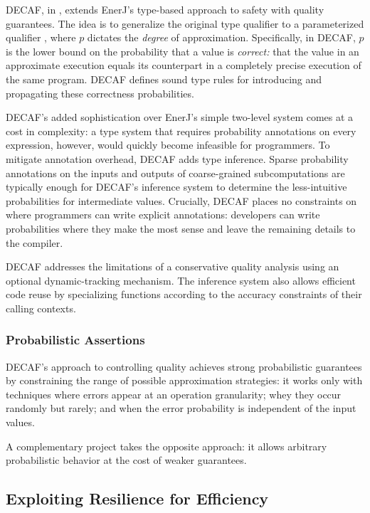 DECAF, in , extends EnerJ's type-based approach to safety with
quality guarantees.
The idea is to generalize the original  type qualifier to a
parameterized qualifier , where $p$ dictates the
\emph{degree} of approximation.
Specifically, in DECAF, $p$ is the lower bound on the probability that a value
is \emph{correct:} that the value in an approximate execution equals its
counterpart in a completely precise execution of the same program.
DECAF defines sound type rules for introducing and propagating these
correctness probabilities.

DECAF's added sophistication over EnerJ's simple two-level system comes at a
cost in complexity:
a type system that requires probability annotations on every expression,
however, would quickly become infeasible for programmers.
To mitigate annotation overhead, DECAF adds type inference.
Sparse probability annotations on the inputs and outputs of coarse-grained
subcomputations are typically enough for DECAF's inference system to determine
the less-intuitive probabilities for intermediate values.
Crucially, DECAF places no constraints on where programmers can write explicit
annotations:
developers can write probabilities where they make the most sense and leave
the remaining details to the compiler.

DECAF addresses the limitations of a conservative quality analysis using
an optional dynamic-tracking mechanism.
The inference system also allows efficient code reuse by specializing
functions according to the accuracy constraints of their calling contexts.

\subsubsection{Probabilistic Assertions}

DECAF's approach to controlling quality achieves strong probabilistic
guarantees by constraining the range of possible approximation strategies:
it works only with techniques where errors appear at an operation granularity;
whey they occur randomly but rarely; and when the error probability is
independent of the input values.

A complementary project takes the opposite approach:
it allows arbitrary probabilistic behavior
at the cost of weaker guarantees.


\subsection{Exploiting Resilience for Efficiency}

